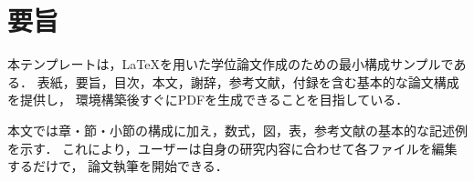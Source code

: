 
\chapter*{要旨}

本テンプレートは，\LaTeX{}を用いた学位論文作成のための最小構成サンプルである．
表紙，要旨，目次，本文，謝辞，参考文献，付録を含む基本的な論文構成を提供し，
環境構築後すぐにPDFを生成できることを目指している．

本文では章・節・小節の構成に加え，数式，図，表，参考文献の基本的な記述例を示す．
これにより，ユーザーは自身の研究内容に合わせて各ファイルを編集するだけで，
論文執筆を開始できる．
